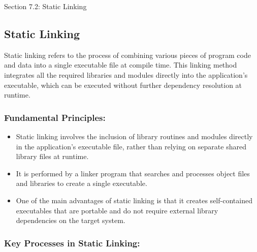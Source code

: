 \begin{notes}{Section 7.2: Static Linking}
    \subsection*{Static Linking}

    Static linking refers to the process of combining various pieces of program code and data into a single executable file at compile time. This linking method integrates all the required libraries 
    and modules directly into the application's executable, which can be executed without further dependency resolution at runtime. \vspace*{1em}
    
    \subsubsection*{Fundamental Principles:}
    
    \begin{itemize}
        \item Static linking involves the inclusion of library routines and modules directly in the application’s executable file, rather than relying on separate shared library files at runtime.
        \item It is performed by a linker program that searches and processes object files and libraries to create a single executable.
        \item One of the main advantages of static linking is that it creates self-contained executables that are portable and do not require external library dependencies on the target system.
    \end{itemize}
    
    \subsubsection*{Key Processes in Static Linking:}
    

\end{notes}
